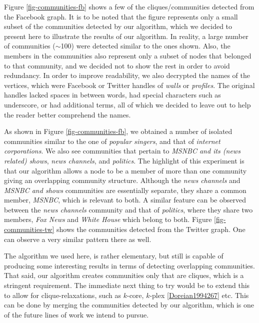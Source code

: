 Figure \ref{fig-communities-fb} shows a few of the cliques/communities detected from the Facebook graph. It is to be noted that the figure represents only a small subset of the communities detected by our algorithm, which we decided to present here to illustrate the results of our algorithm. In reality, a large number of communities ($\sim$100) were detected similar to the ones shown. Also, the members in the communities also represent only a subset of nodes that belonged to that community, and we decided not to show the rest in order to avoid redundancy. In order to improve readability, we also decrypted the names of the vertices, which were Facebook or Twitter handles of {\it walls} or {\it profiles}. The original handles lacked spaces in between words, had special characters such as underscore, or had additional terms, all of which we decided to leave out to help the reader better comprehend the names.

As shown in Figure \ref{fig-communities-fb}, we obtained a number of isolated communities similar to the one of {\it popular singers}, and that of {\it internet corporations}. We also see communities that pertain to {\it MSNBC and its (news related) shows}, {\it news channels}, and {\it politics}. The highlight of this experiment is that our algorithm allows a node to be a member of more than one community giving an overlapping community structure. Although the {\it news channels} and {\it MSNBC and shows} communities are essentially separate, they share a common member, {\it MSNBC}, which is relevant to both. A similar feature can be observed between the {\it news channels} community and that of {\it politics}, where they share two members, {\it Fox News} and {\it White House} which belong to both. Figure \ref{fig-communities-tw} shows the communities detected from the Twitter graph. One can observe a very similar pattern there as well.

The algorithm we used here, is rather elementary, but still is capable of producing some interesting results in terms of detecting overlapping communities. That said, our algorithm creates communities only that are cliques, which is a stringent requirement. The immediate next thing to try would be to extend this to allow for clique-relaxations, such as $k$-core, $k$-plex \ref{Doreian1994267} etc. This can be done by merging the communities detected by our algorithm, which is one of the future lines of work we intend to pursue.
